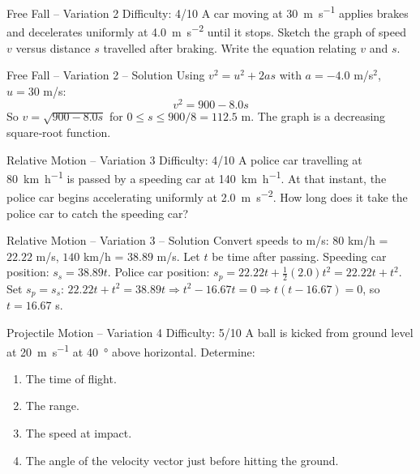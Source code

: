 \documentclass{beamer}
\begin{document}
\begin{frame}[t,shrink=15]{Free Fall – Variation 2 \hfill Difficulty: 4/10}
A car moving at \SI{30}{\meter\per\second} applies brakes and decelerates uniformly at \SI{4.0}{\meter\per\second\squared} until it stops. Sketch the graph of speed $v$ versus distance $s$ travelled after braking. Write the equation relating $v$ and $s$.
\end{frame}

\begin{frame}[shrink=15]{Free Fall – Variation 2 – Solution}
Using $v^2 = u^2 + 2as$ with $a = -4.0$ m/s$^2$, $u=30$ m/s:
\[ v^2 = 900 - 8.0 s \]
So $v = \sqrt{900 - 8.0s}$ for $0 \le s \le 900/8 = 112.5$ m. The graph is a decreasing square‑root function.
\end{frame}

\begin{frame}[t,shrink=15]{Relative Motion – Variation 3 \hfill Difficulty: 4/10}
A police car travelling at \SI{80}{\km\per\hour} is passed by a speeding car at \SI{140}{\km\per\hour}. At that instant, the police car begins accelerating uniformly at \SI{2.0}{\meter\per\second\squared}. How long does it take the police car to catch the speeding car?
\end{frame}

\begin{frame}[shrink=15]{Relative Motion – Variation 3 – Solution}
Convert speeds to m/s: $80$ km/h = $22.22$ m/s, $140$ km/h = $38.89$ m/s.
Let $t$ be time after passing. Speeding car position: $s_s = 38.89 t$. Police car position: $s_p = 22.22 t + \frac12 (2.0) t^2 = 22.22 t + t^2$.
Set $s_p = s_s$: $22.22 t + t^2 = 38.89 t \Rightarrow t^2 - 16.67 t = 0 \Rightarrow t(t - 16.67) = 0$, so $t = 16.67$ s.
\end{frame}

\begin{frame}[t,shrink=15]{Projectile Motion – Variation 4 \hfill Difficulty: 5/10}
A ball is kicked from ground level at \SI{20}{\meter\per\second} at \SI{40}{\degree} above horizontal. Determine:
\begin{enumerate}
    \item The time of flight.
    \item The range.
    \item The speed at impact.
    \item The angle of the velocity vector just before hitting the ground.
\end{enumerate}
\end{frame}
\end{document}
